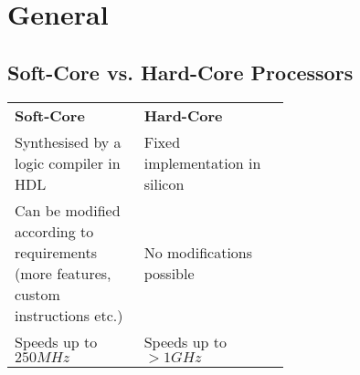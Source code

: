 \section{General}
	\subsection{Soft-Core vs. Hard-Core Processors}
	
		\begin{table}[H]
			\centering
			\begin{tabular}{|p{0.3\linewidth}|p{0.3\linewidth}|}
				 \hline
				 \textbf{Soft-Core} 
				 	& \textbf{Hard-Core}\\
				 \hhline{|=|=|}
				 Synthesised by a logic compiler in HDL  
				 	& Fixed implementation in silicon\\
				 \hline
				 Can be modified according to requirements (more features, custom
				 instructions etc.)
				 	& No modifications possible\\
				 \hline
				 Speeds up to $250MHz$
				 	& Speeds up to $>1GHz$\\
				 \hline			
			\end{tabular}
		\end{table}
		
	